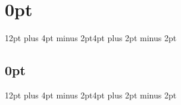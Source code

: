 
\usepackage{multicol}
\usepackage{fontspec}
\usepackage{marvosym}
\usepackage{fontawesome}
\usepackage{orcidlink}
\usepackage{enumitem}
\usepackage{calc}
\usepackage{array}
\usepackage{xcolor}

\newcommand\VRule{\color{lightgray}\vrule width 0.5pt}

\usepackage{sectsty}
\sectionfont{\rmfamily\mdseries\large\bf}
\subsectionfont{\rmfamily\mdseries\normalsize\itshape}

\usepackage{titlesec}
\titlespacing\section{0pt}{12pt plus 4pt minus 2pt}{4pt plus 2pt minus 2pt}
\titlespacing\subsection{0pt}{12pt plus 4pt minus 2pt}{4pt plus 2pt minus 2pt}

\renewenvironment{itemize}{%
  \begin{list}{}{%
    \setlength{\leftmargin}{1.5em}%
    \setlength{\itemsep}{0pt}%
    \setlength{\parsep}{0pt}%
    \setlength{\topsep}{0pt}%
  }%
}{%
  \end{list}%
}

\usepackage{parskip}

\usepackage{fancyhdr}
\usepackage{lastpage}
\makeatletter
\AtBeginDocument{%
  \let\qkitcvauthor\@author
  \let\qkitcvtitle\@title
}
\makeatother
\pagestyle{fancy}
\renewcommand{\headrulewidth}{0pt}
\renewcommand{\footrulewidth}{0pt}
\lhead{}
\chead{}
\rhead{}
\lfoot{}
\cfoot{\scriptsize \qkitcvauthor\ - \qkitcvtitle}
\rfoot{\scriptsize \thepage/{\hypersetup{linkcolor=black}\pageref{LastPage}}}

